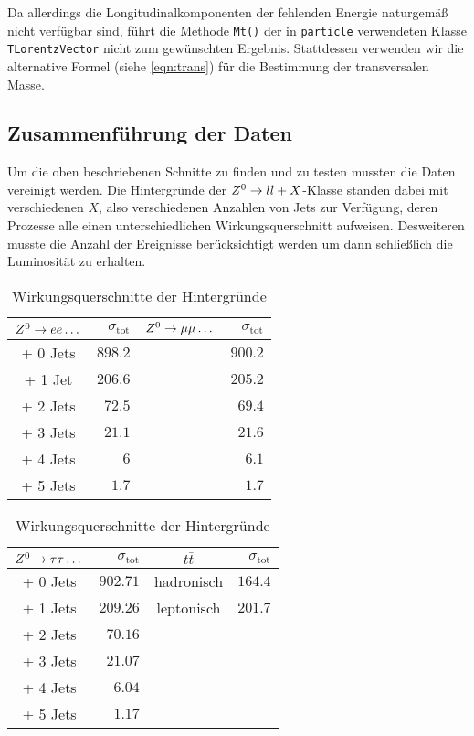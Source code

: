 Da allerdings die Longitudinalkomponenten der fehlenden Energie naturgemäß nicht
verfügbar sind, führt die Methode \lstinline'Mt()' der in \lstinline'particle'
verwendeten Klasse \lstinline'TLorentzVector' nicht zum gewünschten Ergebnis.
Stattdessen verwenden wir die alternative Formel (siehe \ref{eqn:trans}) für die
Bestimmung der transversalen Masse.

\subsection{Zusammenführung der Daten}
\label{cha:normierung}
Um die oben beschriebenen Schnitte zu finden und zu testen mussten die Daten
vereinigt werden. Die Hintergründe der $Z^0\to ll + X$-Klasse standen dabei mit
verschiedenen $X$, also verschiedenen Anzahlen von Jets zur Verfügung, deren
Prozesse alle einen unterschiedlichen Wirkungsquerschnitt aufweisen. Desweiteren
musste die Anzahl der Ereignisse berücksichtigt werden um dann schließlich die
Luminosität zu erhalten.

\begin{table}
  \centering
  \begin{tabular}{cr|cr}
    \toprule
    $Z^0\to ee \dots$ & $\sigma_{\mathrm{tot}}$ & $Z^0\to\mu\mu \dots$ &
    $\sigma_{\mathrm{tot}}$ \\
    \midrule[0.75pt]
    + 0 Jets &  $898.2$ & & $900.2$ \\
    + 1 Jet &   $206.6$ & & $205.2$ \\
    + 2 Jets &  $72.5$  & & $69.4$ \\
    + 3 Jets &  $21.1$  & & $21.6$ \\
    + 4 Jets &  $6$  & & $6.1$ \\
    + 5 Jets &  $1.7$  & & $1.7$ \\
    \bottomrule
  \end{tabular}
  \begin{tabular}{cr|cr}
    \toprule
    $Z^0\to\tau\tau \dots$ & $\sigma_{\mathrm{tot}}$ & $t\bar{t}$ &
    $\sigma_{\mathrm{tot}}$ \\
    \midrule[0.75pt]
    + 0 Jets &  $902.71$  & hadronisch & $164.4$ \\
    + 1 Jets &  $209.26$  & leptonisch & $201.7$ \\
    + 2 Jets &  $70.16$  & & \\
    + 3 Jets &  $21.07$  & & \\
    + 4 Jets &  $6.04$  & & \\
    + 5 Jets &  $1.17$  & & \\
    \bottomrule
  \end{tabular}
  \caption{Wirkungsquerschnitte der Hintergründe}
  \label{tab:wqs}
\end{table}

